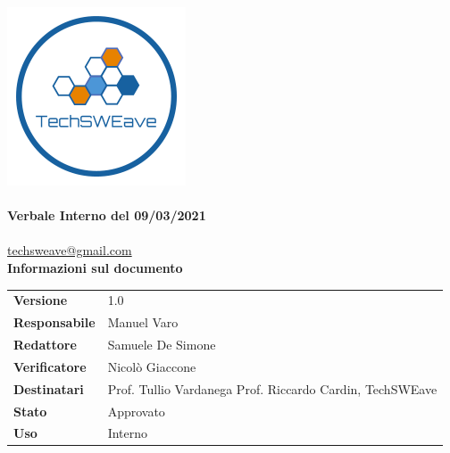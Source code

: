 \documentclass{article}
\begin{document}
\begin{titlepage}
    \begin{center}
        \includegraphics{../../../../Images/logo}\\
        \vspace{20px}
        \textcolor{logo}{\hrulefill}\\
        \vspace{20px}
        \textbf{\huge\textcolor{logo}{Verbale Interno del 09/03/2021}}\\
        \vspace{10px}
        \textcolor{logo}{\hrulefill}\\
        \vspace{20px}
        \href{mailto:techsweave@gmail.com}{techsweave@gmail.com}\\
        \vspace{40px}
        \textbf{Informazioni sul documento}\\
        \vspace{20px}
        \begin{tabular}{p{100px} | p{100px}}
            \textbf{Versione} & 1.0\\
            \textbf{Responsabile} & Manuel Varo\\
            \textbf{Redattore} & Samuele De Simone\\
            \textbf{Verificatore} & Nicolò Giaccone\\
            \textbf{Destinatari} & Prof. Tullio Vardanega \newline Prof. Riccardo Cardin, \newline TechSWEave\\
            \textbf{Stato} & Approvato\\
            \textbf{Uso} & Interno\\
        \end{tabular}
            \vspace{1ex}

    \end{center}
    \end{titlepage}
    \tableofcontents
\end{document}
